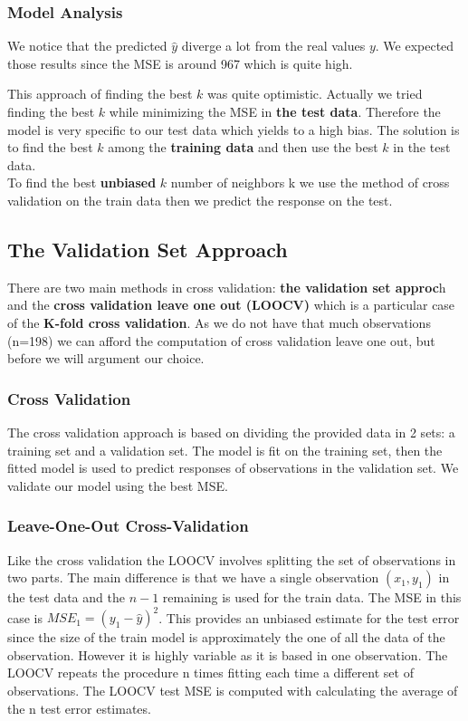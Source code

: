 \documentclass[]{report}
\begin{document}
\subsubsection{Model Analysis}

We notice that the predicted {$\hat{y}$} diverge a lot from the real values $y$. We expected those results since the MSE is around 967 which is quite high. 

This approach of finding the best $k$ was quite optimistic. Actually we tried finding the best $k$ while minimizing the MSE in \textbf{the test data}. Therefore the model is very specific to our test data which yields to a high bias. The solution is to find the best $k$ among the \textbf{training data} and then use the best $k$ in the test data. \\ To find the best \textbf{unbiased} $k$ number of neighbors k we use the method of cross validation on the train data then we predict the response on the test. 

\subsection{The Validation Set Approach}
There are two main methods in cross validation: \textbf{the validation set approc}h and the \textbf{cross validation leave one out (LOOCV)} which is a particular case of the  \textbf{K-fold cross validation}. As we do not have that much observations (n=198) we can afford the computation of cross validation leave one out, but before we will argument our choice.\\

\subsubsection{Cross Validation}
The cross validation approach is based on dividing the provided data in 2 sets: a training set and a validation set. The model is fit on the training set, then the fitted model is used to predict responses of observations in the validation set. We validate our model using the best MSE.

\subsubsection{Leave-One-Out Cross-Validation}
Like the cross validation the LOOCV involves splitting the set of observations in two parts. The main difference is that we have a single observation $(x_1, y_1)$ in the test data and the $n-1$ remaining is used for the train data. The MSE in this case is $MSE_1 =(y_1 - \hat{y})^{2}$. This provides an unbiased estimate for the test error since the size of the train model is approximately the one of all the data of the observation. However it is highly variable as it is based in one observation. The LOOCV repeats the procedure n times fitting each time a different set of observations. The LOOCV test MSE is computed with calculating the average of the n test error estimates.
\end{document}
